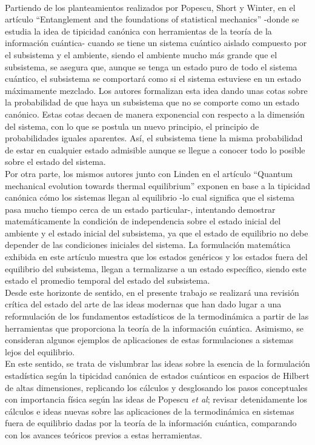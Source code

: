 \\
Partiendo de los planteamientos realizados por Popescu, Short y Winter, en el artículo “Entanglement and the foundations of statistical mechanics” \cite{Popescu2006} -donde se estudia la idea de tipicidad canónica con herramientas de la teoría de la información cuántica- cuando se tiene un sistema cuántico aislado compuesto por el subsistema y el ambiente, siendo el ambiente mucho más grande que el subsistema, se asegura que, aunque se tenga un estado puro de todo el sistema cuántico, el subsistema se comportará como si el sistema estuviese en un estado máximamente mezclado. Los autores formalizan esta idea dando unas cotas sobre la probabilidad de que haya un subsistema que no se comporte como un estado canónico. Estas cotas decaen de manera exponencial con respecto a la dimensión del sistema, con lo que se postula un nuevo principio, el principio de probabilidades iguales aparentes. Así, el subsistema tiene la misma probabilidad de estar en cualquier estado admisible aunque se llegue a conocer todo lo posible sobre el estado del sistema.
\\
Por otra parte, los mismos autores junto con Linden en el artículo “Quantum mechanical evolution towards thermal equilibrium” \cite{LindenPaper} exponen en base a la tipicidad canónica cómo los sistemas llegan al equilibrio -lo cual significa que el sistema pasa mucho tiempo cerca de un estado particular-, intentando demostrar matemáticamente la condición de independencia sobre el estado inicial del ambiente y el estado inicial del subsistema, ya que el estado de equilibrio no debe depender de las condiciones iniciales del sistema. La formulación matemática exhibida en este artículo muestra que los estados genéricos y los estados fuera del equilibrio del subsistema, llegan a termalizarse a un estado específico, siendo este estado el promedio temporal del estado del subsistema.
\\
Desde este horizonte de sentido, en el presente trabajo se realizará una revisión crítica del estado del arte de las ideas modernas que han dado lugar a una reformulación de los fundamentos estadísticos de la termodinámica a partir de las herramientas que proporciona la teoría de la información cuántica. Asimismo, se consideran algunos ejemplos de aplicaciones de estas formulaciones a sistemas lejos del equilibrio.
\\
En este sentido, se trata de vislumbrar las ideas sobre la esencia de la formulación estadística según la tipicidad canónica de estados cuánticos en espacios de Hilbert de altas dimensiones, replicando los cálculos y desglosando los pasos conceptuales con importancia física según las ideas de Popescu \textit{et al}; revisar detenidamente los cálculos e ideas nuevas  sobre las aplicaciones de la termodinámica en sistemas fuera de equilibrio dadas por la teoría de la información cuántica, comparando con los avances teóricos previos a estas herramientas.
